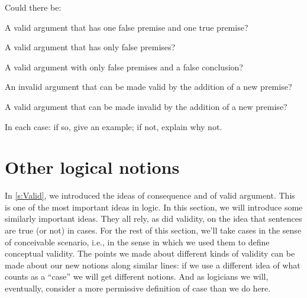 \problempart
\label{pr.EnglishCombinations}
Could there be:
	\begin{compactlist}
		\item A valid argument that has one false premise and one true premise?
		\item A valid argument that has only false premises?
		\item A valid argument with only false premises and a false conclusion?
		\item An invalid argument that can be made valid by the addition of a new premise?
		\item A valid argument that can be made invalid by the addition of a new premise?
	\end{compactlist}
In each case: if so, give an example; if not, explain why not.


\chapter{Other logical notions}\label{s:BasicNotions}

In \cref{s:Valid}, we introduced the ideas of consequence and of valid argument.  This is one of the most important ideas in logic. In this section, we will introduce some similarly important ideas. They all rely, as did validity, on the idea that sentences are true (or not) in cases. For the rest of this section, we'll take cases in the sense of conceivable scenario, i.e., in the sense in which we used them to define conceptual validity. The points we made about different kinds of validity can be made about our new notions along similar lines: if we use a different idea of what counts as a ``case'' we will get different notions.  And as logicians we will, eventually, consider a more permissive definition of case than we do here.  


